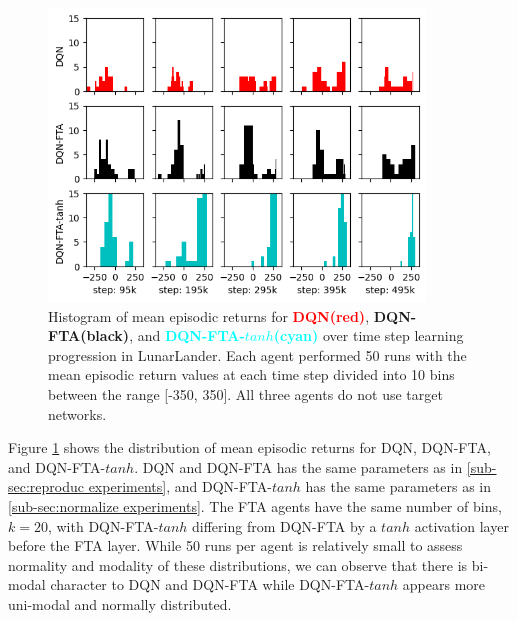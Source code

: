 \documentclass{article}
\begin{document}
\begin{figure}[h]
    \centering
    \includegraphics[width=10cm]{distribution.png}
    \caption{Histogram of mean episodic returns for {\textcolor{red} {\bf DQN(red)}}, {\bf DQN-FTA(black)}, and {\textcolor{cyan} {\bf DQN-FTA-$tanh$(cyan)}} over time step learning progression in LunarLander. Each agent performed 50 runs with the mean episodic return values at each time step divided into 10 bins between the range [-350, 350]. All three agents do not use target networks.}
    \label{fig:dist}
\end{figure}

Figure \ref{fig:dist} shows the distribution of mean episodic returns for DQN, DQN-FTA, and DQN-FTA-$tanh$. DQN and DQN-FTA has the same parameters as in \ref{sub-sec:reproduc experiments}, and DQN-FTA-$tanh$ has the same parameters as in \ref{sub-sec:normalize experiments}. The FTA agents have the same number of bins, $k=20$, with DQN-FTA-$tanh$ differing from DQN-FTA by a $tanh$ activation layer before the FTA layer. While 50 runs per agent is relatively small to assess normality and modality of these distributions, we can observe that there is bi-modal character to DQN and DQN-FTA while DQN-FTA-$tanh$ appears more uni-modal and normally distributed.
\end{document}
